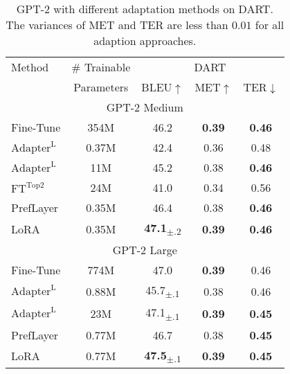 \begin{table}[h]
\centering
\begin{tabular}{lc|ccc}
\hline
\toprule
Method & \# Trainable &  \multicolumn{3}{c}{DART} \\ %
       & Parameters & BLEU$\uparrow$ & MET$\uparrow$ & TER$\downarrow$  \\
\midrule
 \multicolumn{5}{c}{GPT-2 Medium}\\
Fine-Tune & 354M & 46.2 & \textbf{0.39} & \textbf{0.46}  \\
$\text{Adapter}^{\text{L}}$ & 0.37M & 42.4 & 0.36 & 0.48 \\
$\text{Adapter}^{\text{L}}$ & 11M & 45.2 & 0.38 & \textbf{0.46} \\
$\text{FT}^{\text{Top2}}$ & 24M & 41.0 & 0.34 & 0.56 \\
PrefLayer & 0.35M & 46.4 & 0.38 & \textbf{0.46}   \\
LoRA  & 0.35M & \textbf{47.1}\textsubscript{$\pm$.2}  & \textbf{0.39} & \textbf{0.46} \\
\midrule
 \multicolumn{5}{c}{GPT-2 Large}\\
Fine-Tune & 774M & 47.0 & \textbf{0.39} & 0.46  \\
$\text{Adapter}^{\text{L}}$ & 0.88M & 45.7\textsubscript{$\pm$.1} & 0.38 & 0.46 \\
$\text{Adapter}^{\text{L}}$ & 23M & 47.1\textsubscript{$\pm$.1} & \textbf{0.39} & \textbf{0.45} \\
PrefLayer & 0.77M & 46.7 & 0.38 & \textbf{0.45} \\
LoRA & 0.77M & \textbf{47.5}\textsubscript{$\pm$.1} & \textbf{0.39} &  \textbf{0.45} \\
\bottomrule
\end{tabular}
\caption{GPT-2 with different adaptation methods on DART. The variances of MET and TER are less than $0.01$ for all adaption approaches. }
\label{tab:gpt2_ft_dart}
\end{table}





